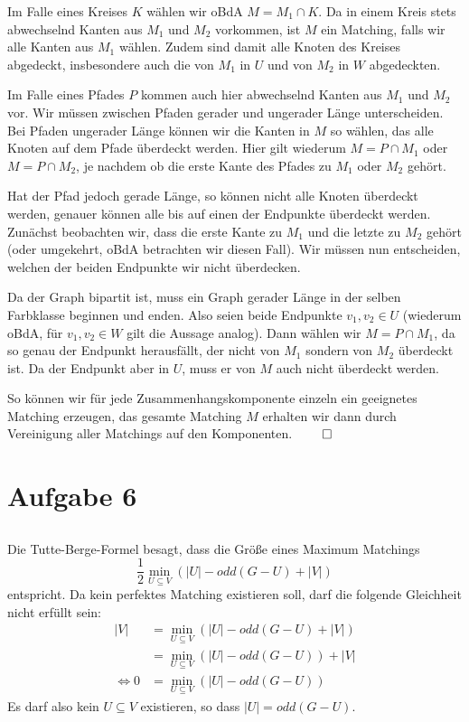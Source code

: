 \documentclass[a4paper]{article}
\begin{document}
Im Falle eines Kreises $K$ wählen wir oBdA $M = M_1 \cap K$. Da in einem
Kreis stets abwechselnd Kanten aus $M_1$ und $M_2$ vorkommen, ist $M$ ein
Matching, falls wir alle Kanten aus $M_1$ wählen. Zudem sind damit alle
Knoten des Kreises abgedeckt, insbesondere auch die von $M_1$ in $U$ und von
$M_2$ in $W$ abgedeckten.

Im Falle eines Pfades $P$ kommen auch hier abwechselnd Kanten aus $M_1$ und
$M_2$ vor. Wir müssen zwischen Pfaden gerader und ungerader Länge unterscheiden.
Bei Pfaden ungerader Länge können wir die Kanten in $M$ so wählen, das alle
Knoten auf dem Pfade überdeckt werden. Hier gilt wiederum $M = P \cap M_1$
oder $M = P \cap M_2$, je nachdem ob die erste Kante des Pfades zu $M_1$
oder $M_2$ gehört.

Hat der Pfad jedoch gerade Länge, so können nicht alle Knoten überdeckt
werden, genauer können alle bis auf einen der Endpunkte überdeckt werden.
Zunächst beobachten wir, dass die erste Kante zu $M_1$ und die
letzte zu $M_2$ gehört (oder umgekehrt, oBdA betrachten wir diesen Fall).
Wir müssen nun entscheiden, welchen der beiden Endpunkte wir nicht
überdecken.

Da der Graph bipartit ist, muss ein Graph gerader Länge in der selben
Farbklasse beginnen und enden. Also seien beide Endpunkte $v_1, v_2 \in U$
(wiederum oBdA, für $v_1, v_2 \in W$ gilt die Aussage analog).
Dann wählen wir $M = P \cap M_1$, da so genau der Endpunkt herausfällt, der
nicht von $M_1$ sondern von $M_2$ überdeckt ist. Da der Endpunkt aber in
$U$, muss er von $M$ auch nicht überdeckt werden.

So können wir für jede Zusammenhangskomponente einzeln ein geeignetes
Matching erzeugen, das gesamte Matching $M$ erhalten wir dann durch
Vereinigung aller Matchings auf den Komponenten. $\qed$

\section{Aufgabe 6}
\subsection{}
Die Tutte-Berge-Formel besagt, dass die Größe eines Maximum Matchings
\[
	\frac{1}{2} \min_{U \subseteq V} ( |U| - odd(G - U) + |V|)
\]
entspricht. Da kein perfektes Matching existieren soll, darf die folgende
Gleichheit nicht erfüllt sein:
\begin{align*}
|V| &= \min_{U \subseteq V} ( |U| - odd(G - U) + |V|) \\
	&= \min_{U \subseteq V} ( |U| - odd(G - U) ) + |V| \\
\Leftrightarrow 0 &= \min_{U \subseteq V} ( |U| - odd(G - U) )
\end{align*}
Es darf also kein $U \subseteq V$ existieren, so dass $|U| = odd(G - U)$.
\end{document}
